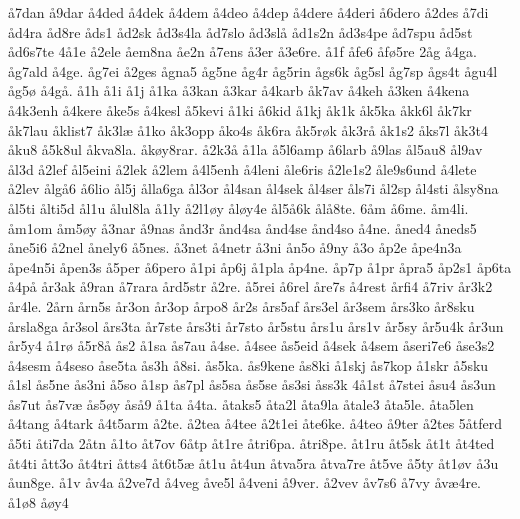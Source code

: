 {å7dan
å9dar
å4ded
å4dek
å4dem
å4deo
å4dep
å4dere
å4deri
å6dero
å2des
å7di
åd4ra
åd8re
åds1
åd2sk
åd3s4la
åd7slo
åd3slå
åd1s2n
åd3s4pe
åd7spu
åd5st
åd6s7te
4å1e
å2ele
åem8na
åe2n
å7ens
å3er
å3e6re.
å1f
åfe6
åfø5re
2åg
å4ga.
åg7ald
å4ge.
åg7ei
å2ges
ågna5
åg5ne
åg4r
åg5rin
ågs6k
åg5sl
åg7sp
ågs4t
ågu4l
åg5ø
å4gå.
å1h
å1i
å1j
å1ka
å3kan
å3kar
å4karb
åk7av
å4keh
å3ken
å4kena
å4k3enh
å4kere
åke5s
å4kesl
å5kevi
å1ki
å6kid
å1kj
åk1k
åk5ka
åkk6l
åk7kr
åk7lau
åklist7
åk3læ
å1ko
åk3opp
åko4s
åk6ra
åk5røk
åk3rå
åk1s2
åks7l
åk3t4
åku8
å5k8ul
åkva8la.
åkøy8rar.
å2k3å
å1la
å5l6amp
å6larb
å9las
ål5au8
ål9av
ål3d
å2lef
ål5eini
å2lek
å2lem
å4l5enh
å4leni
åle6ris
å2le1s2
åle9s6und
å4lete
å2lev
ålgå6
å6lio
ål5j
ålla6ga
ål3or
ål4san
ål4sek
ål4ser
åls7i
ål2sp
ål4sti
ålsy8na
ål5ti
ålti5d
ål1u
ålul8la
å1ly
å2l1øy
åløy4e
ål5å6k
ålå8te.
6åm
å6me.
åm4li.
åm1om
åm5øy
å3nar
å9nas
ånd3r
ånd4sa
ånd4se
ånd4so
å4ne.
åned4
åneds5
åne5i6
å2nel
ånely6
å5nes.
å3net
å4netr
å3ni
ån5o
å9ny
å3o
åp2e
åpe4n3a
åpe4n5i
åpen3s
å5per
å6pero
å1pi
åp6j
å1pla
åp4ne.
åp7p
å1pr
åpra5
åp2s1
åp6ta
å4på
år3ak
å9ran
å7rara
ård5str
å2re.
å5rei
å6rel
åre7s
å4rest
årfi4
å7riv
år3k2
år4le.
2årn
årn5s
år3on
år3op
årpo8
år2s
års5af
års3el
år3sem
års3ko
år8sku
årsla8ga
år3sol
års3ta
år7ste
års3ti
år7sto
år5stu
års1u
års1v
år5sy
år5u4k
år3un
år5y4
å1rø
å5r8å
ås2
å1sa
ås7au
å4se.
å4see
ås5eid
å4sek
å4sem
åseri7e6
åse3s2
å4sesm
å4seso
åse5ta
ås3h
å8si.
ås5ka.
ås9kene
ås8ki
å1skj
ås7kop
å1skr
å5sku
å1sl
ås5ne
ås3ni
å5so
å1sp
ås7pl
ås5sa
ås5se
ås3si
åss3k
4å1st
å7stei
åsu4
ås3un
ås7ut
ås7væ
ås5øy
åså9
å1ta
å4ta.
åtaks5
åta2l
åta9la
åtale3
åta5le.
åta5len
å4tang
å4tark
å4t5arm
å2te.
å2tea
å4tee
å2t1ei
åte6ke.
å4teo
å9ter
å2tes
5åtferd
å5ti
åti7da
2åtn
å1to
åt7ov
6åtp
åt1re
åtri6pa.
åtri8pe.
åt1ru
åt5sk
åt1t
åt4ted
åt4ti
ått3o
åt4tri
åtts4
åt6t5æ
åt1u
åt4un
åtva5ra
åtva7re
åt5ve
å5ty
åt1øv
å3u
åun8ge.
å1v
åv4a
å2ve7d
å4veg
åve5l
å4veni
å9ver.
å2vev
åv7s6
å7vy
åvæ4re.
å1ø8
åøy4}
